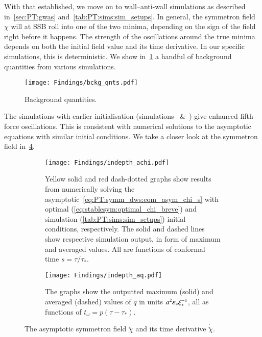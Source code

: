 With that established, we move on to wall--anti-wall simulations as described in~\cref{sec:PT:gwas} and~\cref{tab:PT:sims:sim_setups}. %
In general, the symmetron field $\chi$ will at SSB roll into one of the two minima, depending on the sign of the field right before it happens. The strength of the oscillations around the true minima depends on both the initial field value and its time derivative. In our specific simulations, this is deterministic. %
We show in~\cref{fig:results:achi:bckg_qnts} a handful of background quantities from various simulations. %
\begin{figure}[h]
    \centering
    \texttt{[image: Findings/bckg\_qnts.pdf]}
    \caption{Background quantities. }
    \label{fig:results:achi:bckg_qnts}
\end{figure}
The simulations with earlier initialisation (simulations~ \&~) give enhanced fifth-force oscillations. This is consistent with numerical solutions to the asymptotic equations with similar initial conditions. We take a closer look at the symmetron field in~\cref{fig:results:achi:indepth_achi_aq}. %


\begin{figure}[ht]
    \centering
    \begin{subfigure}[b]{\linewidth}
        \centering
        \texttt{[image: Findings/indepth\_achi.pdf]}
        \caption{Yellow solid and red dash-dotted graphs show results from numerically solving the asymptotic~\cref{eq:PT:symm_dws:eom_asym_chi_s} with optimal (\cref{eq:stablesym:optimal_chi_breve}) and simulation (\cref{tab:PT:sims:sim_setups}) initial conditions, respectively. The solid and dashed lines show respective simulation output, in form of maximum and averaged values. All are functions of conformal time $s=\tau/\tau_\ast$.}
        \label{fig:results:achi:indepth_achi}
    \end{subfigure}
    \hfill
    \begin{subfigure}[b]{\linewidth}
        \centering
        \texttt{[image: Findings/indepth\_aq.pdf]}
        \caption{The graphs show the outputted maximum (solid) and averaged (dashed) values of $q$ in units $a^2 \varepsilon_\ast \xi_\ast^{-1}$, all as functions of $t_\omega = p(\tau-\tau_\ast)$.}
        \label{fig:results:achi:indepth_aq}
    \end{subfigure}
    \caption{The asymptotic symmetron field $\breve{\chi}$ and its time derivative $\dot{\breve{\chi}}$.}
    \label{fig:results:achi:indepth_achi_aq}
\end{figure}

